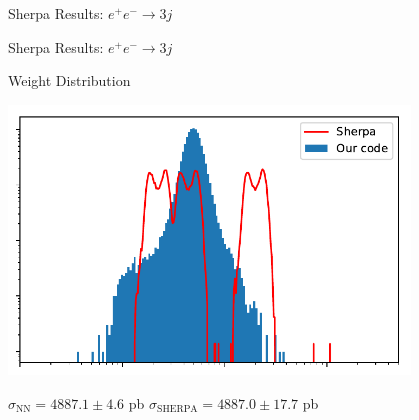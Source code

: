 \documentclass{beamer}
\begin{document}
\begin{frame}{Sherpa Results: $e^+ e^- \rightarrow 3j$}
\end{frame}

\begin{frame}{Sherpa Results: $e^+ e^- \rightarrow 3j$}
    \begin{block}{Weight Distribution}
    \begin{center}
    \includegraphics[width=0.8\textwidth]{figs/weights.pdf}
    \end{center}
    \end{block}
    $\sigma_{\text{NN}} = 4887.1 \pm 4.6$ pb \hfill $\sigma_{\text{SHERPA}} = 4887.0 \pm 17.7$ pb
\end{frame}
\end{document}

